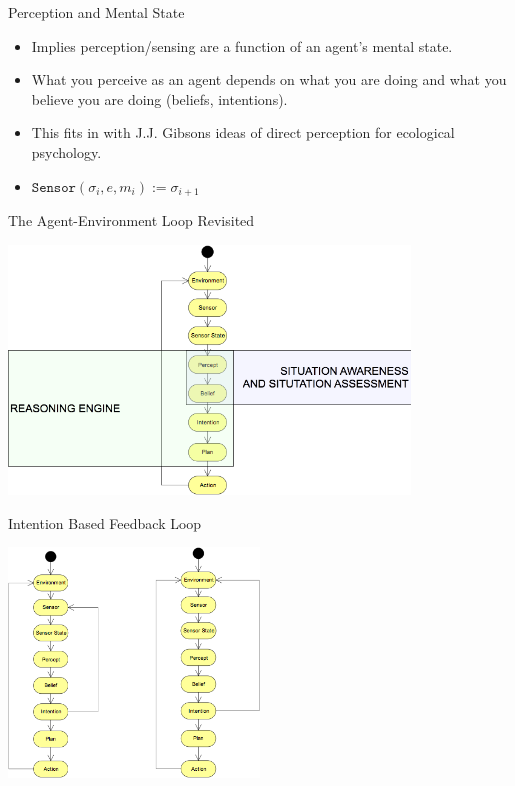 \documentclass[aspectratio=1610,xcolor=dvipsnames,t]{beamer}
\begin{document}
\begin{frame}{Perception and Mental State}
    \begin{itemize} 
        \item Implies perception/sensing are a function of an agent's mental
            state.
        \item What you perceive as an agent depends on what you are doing and
            what you believe you are doing (beliefs, intentions).
        \item This fits in with J.J. Gibsons ideas of direct perception for 
            ecological psychology. 
        \item $\texttt{Sensor}(\sigma_i, e, m_i) := \sigma_{i + 1}$ 
    \end{itemize} 
\end{frame} 

\begin{frame}{The Agent-Environment Loop Revisited}
    \begin{center}
        \includegraphics[width=0.8\textwidth]{agent-loop-revisited} 
    \end{center} 
\end{frame} 

\begin{frame}{Intention Based Feedback Loop}
    \begin{center} 
        \includegraphics[width=0.5\textwidth]{intention-feedback} 
    \end{center} 
\end{frame} 
\end{document}
